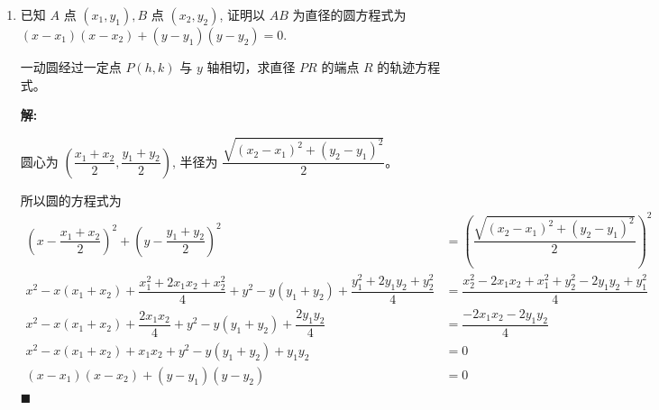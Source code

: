 \documentclass[10pt]{article}
\newcommand{\sol}{\textbf{解:} }
\begin{document}
\begin{enumerate}[leftmargin=*]
  \item 已知 $A$ 点 $\left(x_{1}, y_{1}\right), B$ 点 $\left(x_{2}, y_{2}\right)$, 证明以 $AB$ 为直径的圆方程式为 $\left(x-x_{1}\right)\left(x-x_{2}\right)+\left(y-y_{1}\right)\left(y-y_{2}\right)=0$.

        一动圆经过一定点 $P(h, k)$ 与 $y$ 轴相切，求直径 $PR$ 的端点 $R$ 的轨迹方程式。

        \sol{}

        圆心为 $\left(\dfrac{x_{1}+x_{2}}{2}, \dfrac{y_{1}+y_{2}}{2}\right)$, 半径为 $\dfrac{\sqrt{(x_{2}-x_{1})^{2}+(y_{2}-y_{1})^{2}}}{2}$。

        所以圆的方程式为
        \begin{align*}
          \left(x-\dfrac{x_{1}+x_{2}}{2}\right)^{2} + \left(y-\dfrac{y_{1}+y_{2}}{2}\right)^{2}                                                   & = \left(\dfrac{\sqrt{(x_{2}-x_{1})^{2}+(y_{2}-y_{1})^{2}}}{2}\right)^{2}     \\
          x^2 - x(x_{1}+x_{2}) + \dfrac{x^{2}_{1}+2x_{1}x_{2}+x^{2}_{2}}{4} + y^{2} - y(y_{1}+y_{2}) + \dfrac{y^{2}_{1}+2y_{1}y_{2}+y^{2}_{2}}{4} & = \dfrac{x^{2}_{2}-2x_{1}x_{2}+x^{2}_{1}+y^{2}_{2}-2y_{1}y_{2}+y^{2}_{1}}{4} \\
          x^2 - x(x_{1}+x_{2}) + \dfrac{2x_{1}x_{2}}{4} + y^{2} - y(y_{1}+y_{2}) + \dfrac{2y_{1}y_{2}}{4}                                         & = \dfrac{-2x_{1}x_{2}-2y_{1}y_{2}}{4}                                        \\
          x^2 - x(x_{1}+x_{2}) + x_{1}x_{2} + y^{2} - y(y_{1}+y_{2}) + y_{1}y_{2}                                                                 & = 0                                                                          \\
          (x-x_{1})(x-x_{2}) + (y-y_{1})(y-y_{2})                                                                                                 & = 0
        \end{align*} \hfill$\blacksquare$


\end{enumerate}
\end{document}
